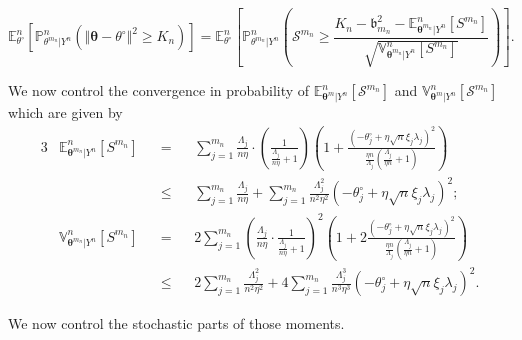 \[\mathds{E}_{\theta^{\circ}}^{n}\left[\mathds{P}_{\theta^{m_{n}}\vert Y^{n}}^{n}\left(\Vert \boldsymbol{\theta} - \theta^{\circ} \Vert^{2} \geq K_{n}\right)\right] = \mathds{E}_{\theta^{\circ}}^{n}\left[\mathds{P}_{\theta^{m_{n}}\vert Y^{n}}^{n}\left(\mathcal{S}^{m_{n}} \geq \frac{K_{n} - \mathfrak{b}_{m_{n}}^{2} - \mathds{E}_{\boldsymbol{\theta}^{m_{n}} \vert Y^{n}}^{n}\left[S^{m_{n}}\right]}{\sqrt{\mathds{V}_{\boldsymbol{\theta}^{m_{n}} \vert Y^{n}}^{n}\left[S^{m_{n}}\right]}}\right)\right].\]

We now control the convergence in probability of $\mathds{E}_{\boldsymbol{\theta}^{m} \vert Y^{n}}^{n}\left[\mathcal{S}^{m_{n}}\right]$ and $\mathds{V}_{\boldsymbol{\theta}^{m} \vert Y^{n}}^{n}\left[\mathcal{S}^{m_{n}}\right]$ which are given by
\begin{alignat*}{3}
&\mathds{E}_{\boldsymbol{\theta}^{m_{n}} \vert Y^{n}}^{n}\left[S^{m_{n}}\right] &&=&& \sum\limits_{j = 1}^{m_{n}} \frac{\Lambda_{j}}{n \eta}\cdot \left(\frac{1}{\frac{\Lambda_{j}}{n \eta} + 1}\right)\left(1 + \frac{\left(- \theta^{\circ}_{j} + \eta \sqrt{n} \xi_{j} \lambda_{j}\right)^{2}}{\frac{\eta n}{\Lambda_{j}}\left(\frac{\Lambda_{j}}{\eta n} + 1\right)}\right)\\
& && \leq && \sum\limits_{j = 1}^{m_{n}} \frac{\Lambda_{j}}{n \eta} + \sum\limits_{j = 1}^{m_{n}} \frac{\Lambda_{j}^{2}}{n^{2} \eta^{2}}\left(- \theta^{\circ}_{j} + \eta \sqrt{n} \xi_{j} \lambda_{j}\right)^{2};\\
&\mathds{V}_{\boldsymbol{\theta}^{m_{n}} \vert Y^{n}}^{n}\left[S^{m_{n}}\right] &&=&& 2 \sum\limits_{j = 1}^{m_{n}} \left(\frac{\Lambda_{j}}{n \eta}\cdot \frac{1}{\frac{\Lambda_{j}}{n \eta} + 1}\right)^{2}\left(1 + 2 \frac{\left(- \theta^{\circ}_{j} + \eta \sqrt{n} \xi_{j} \lambda_{j}\right)^{2}}{\frac{\eta n}{\Lambda_{j}}\left(\frac{\Lambda_{j}}{\eta n} + 1\right)}\right)\\
& &&\leq && 2 \sum\limits_{j = 1}^{m_{n}} \frac{\Lambda_{j}^{2}}{n^{2} \eta^{2}} + 4 \sum\limits_{j = 1}^{m_{n}} \frac{\Lambda_{j}^{3}}{n^{3} \eta^{3}} \left(- \theta^{\circ}_{j} + \eta \sqrt{n} \xi_{j} \lambda_{j}\right)^{2}.
\end{alignat*}

We now control the stochastic parts of those moments.

